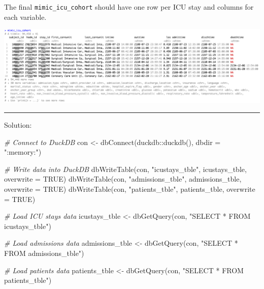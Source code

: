\documentclass[
]{article}
\newenvironment{Shaded}{\begin{snugshade}}{\end{snugshade}}
\newcommand{\AttributeTok}[1]{\textcolor[rgb]{0.77,0.63,0.00}{#1}}
\newcommand{\CommentTok}[1]{\textcolor[rgb]{0.56,0.35,0.01}{\textit{#1}}}
\newcommand{\ConstantTok}[1]{\textcolor[rgb]{0.00,0.00,0.00}{#1}}
\newcommand{\FunctionTok}[1]{\textcolor[rgb]{0.00,0.00,0.00}{#1}}
\newcommand{\NormalTok}[1]{\textcolor[rgb]{0.00,0.00,0.00}{#1}}
\newcommand{\OtherTok}[1]{\textcolor[rgb]{0.56,0.35,0.01}{#1}}
\newcommand{\SpecialCharTok}[1]{\textcolor[rgb]{0.00,0.00,0.00}{#1}}
\newcommand{\StringTok}[1]{\textcolor[rgb]{0.31,0.60,0.02}{#1}}
\begin{document}
The final \texttt{mimic\_icu\_cohort} should have one row per ICU stay
and columns for each variable.

\includegraphics{images/mimic_icu_cohort.png}

\begin{center}\rule{0.5\linewidth}{0.5pt}\end{center}

Solution:

\begin{Shaded}
\begin{Highlighting}[]
\CommentTok{\# Connect to DuckDB}
\NormalTok{con }\OtherTok{\textless{}{-}} \FunctionTok{dbConnect}\NormalTok{(duckdb}\SpecialCharTok{::}\FunctionTok{duckdb}\NormalTok{(), }\AttributeTok{dbdir =} \StringTok{":memory:"}\NormalTok{)}

\CommentTok{\# Write data into DuckDB}
\FunctionTok{dbWriteTable}\NormalTok{(con, }\StringTok{"icustays\_tble"}\NormalTok{, icustays\_tble, }\AttributeTok{overwrite =} \ConstantTok{TRUE}\NormalTok{)}
\FunctionTok{dbWriteTable}\NormalTok{(con, }\StringTok{"admissions\_tble"}\NormalTok{, admissions\_tble, }\AttributeTok{overwrite =} \ConstantTok{TRUE}\NormalTok{)}
\FunctionTok{dbWriteTable}\NormalTok{(con, }\StringTok{"patients\_tble"}\NormalTok{, patients\_tble, }\AttributeTok{overwrite =} \ConstantTok{TRUE}\NormalTok{)}

\CommentTok{\# Load ICU stays data}
\NormalTok{icustays\_tble }\OtherTok{\textless{}{-}} \FunctionTok{dbGetQuery}\NormalTok{(con, }\StringTok{"SELECT * FROM icustays\_tble"}\NormalTok{)}

\CommentTok{\# Load admissions data}
\NormalTok{admissions\_tble }\OtherTok{\textless{}{-}} \FunctionTok{dbGetQuery}\NormalTok{(con, }\StringTok{"SELECT * FROM admissions\_tble"}\NormalTok{)}

\CommentTok{\# Load patients data}
\NormalTok{patients\_tble }\OtherTok{\textless{}{-}} \FunctionTok{dbGetQuery}\NormalTok{(con, }\StringTok{"SELECT * FROM patients\_tble"}\NormalTok{)}
\end{Highlighting}
\end{Shaded}
\end{document}
